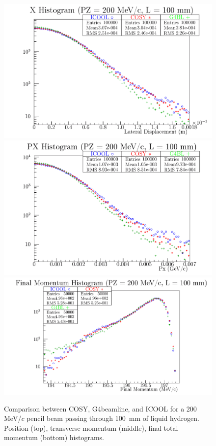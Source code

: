 \documentclass{jacow}
\begin{document}
\begin{figure}[!ht]
\centering
\includegraphics[width=\columnwidth]{LH.X.200.100.png}
\includegraphics[width=\columnwidth]{LH.PX.200.100.png}
\includegraphics[width=\columnwidth]{LH.strag.200.100.png}
\caption{Comparison between COSY, G4beamline, and ICOOL for a 200 MeV/$c$ pencil beam passing through 100~mm of liquid hydrogen. Position (top), transverse momentum (middle), final total momentum (bottom) histograms.}
\label{fig:LH_validation}
\end{figure}
\end{document}
